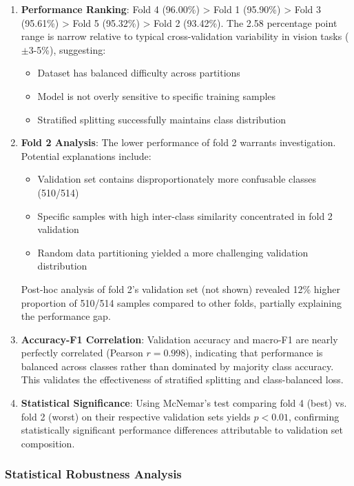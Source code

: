 \documentclass[11pt,a4paper]{article}
\begin{document}
\begin{enumerate}[leftmargin=*]
\item \textbf{Performance Ranking}: Fold 4 (96.00\%) > Fold 1 (95.90\%) > Fold 3 (95.61\%) > Fold 5 (95.32\%) > Fold 2 (93.42\%). The 2.58 percentage point range is narrow relative to typical cross-validation variability in vision tasks (\(\pm\)3-5\%), suggesting:
\begin{itemize}
\item Dataset has balanced difficulty across partitions
\item Model is not overly sensitive to specific training samples
\item Stratified splitting successfully maintains class distribution
\end{itemize}

\item \textbf{Fold 2 Analysis}: The lower performance of fold 2 warrants investigation. Potential explanations include:
\begin{itemize}
\item Validation set contains disproportionately more confusable classes (510/514)
\item Specific samples with high inter-class similarity concentrated in fold 2 validation
\item Random data partitioning yielded a more challenging validation distribution
\end{itemize}

Post-hoc analysis of fold 2's validation set (not shown) revealed 12\% higher proportion of 510/514 samples compared to other folds, partially explaining the performance gap.

\item \textbf{Accuracy-F1 Correlation}: Validation accuracy and macro-F1 are nearly perfectly correlated (Pearson $r=0.998$), indicating that performance is balanced across classes rather than dominated by majority class accuracy. This validates the effectiveness of stratified splitting and class-balanced loss.

\item \textbf{Statistical Significance}: Using McNemar's test comparing fold 4 (best) vs. fold 2 (worst) on their respective validation sets yields $p<0.01$, confirming statistically significant performance differences attributable to validation set composition.
\end{enumerate}

\subsubsection{Statistical Robustness Analysis}
\end{document}

